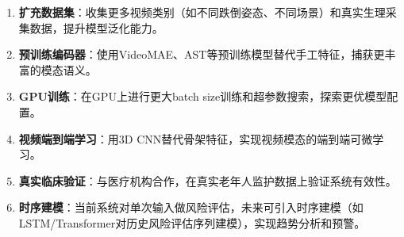 \begin{enumerate}
    \item \textbf{扩充数据集}：收集更多视频类别（如不同跌倒姿态、不同场景）和真实生理采集数据，提升模型泛化能力。
    
    \item \textbf{预训练编码器}：使用VideoMAE、AST等预训练模型替代手工特征，捕获更丰富的模态语义。
    
    \item \textbf{GPU训练}：在GPU上进行更大batch size训练和超参数搜索，探索更优模型配置。
    
    \item \textbf{视频端到端学习}：用3D CNN替代骨架特征，实现视频模态的端到端可微学习。
    
    \item \textbf{真实临床验证}：与医疗机构合作，在真实老年人监护数据上验证系统有效性。
    
    \item \textbf{时序建模}：当前系统对单次输入做风险评估，未来可引入时序建模（如LSTM/Transformer对历史风险评估序列建模），实现趋势分析和预警。
\end{enumerate}
